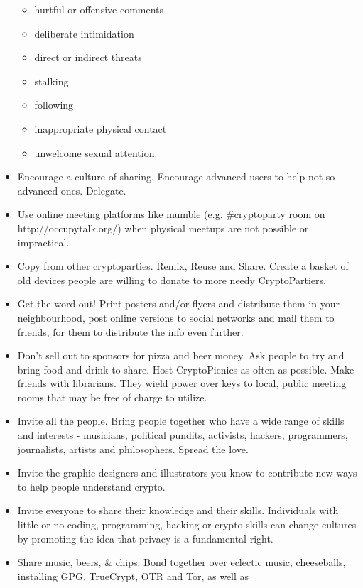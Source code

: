 \begin{itemize}
  \begin{itemize}
  \item
    hurtful or offensive comments
  \item
    deliberate intimidation
  \item
    direct or indirect threats
  \item
    stalking
  \item
    following
  \item
    inappropriate physical contact
  \item
    unwelcome sexual attention.
  \end{itemize}
\item
  Encourage a culture of sharing. Encourage advanced users to help
  not-so advanced ones. Delegate.
\item
  Use online meeting platforms like mumble (e.g. \#cryptoparty room on
  http://occupytalk.org/) when physical meetups are not possible or
  impractical.
\item
  Copy from other cryptoparties. Remix, Reuse and Share. Create a basket
  of old devices people are willing to donate to more needy
  CryptoPartiers.
\item
  Get the word out! Print posters and/or flyers and distribute them in
  your neighbourhood, post online versions to social networks and mail
  them to friends, for them to distribute the info even further.
\item
  Don't sell out to sponsors for pizza and beer money. Ask people to try
  and bring food and drink to share. Host CryptoPicnics as often as
  possible. Make friends with librarians. They wield power over keys to
  local, public meeting rooms that may be free of charge to utilize.
\item
  Invite all the people. Bring people together who have a wide range of
  skills and interests - musicians, political pundits, activists,
  hackers, programmers, journalists, artists and philosophers. Spread
  the love.
\item
  Invite the graphic designers and illustrators you know to contribute
  new ways to help people understand crypto.
\item
  Invite everyone to share their knowledge and their skills. Individuals
  with little or no coding, programming, hacking or crypto skills can
  change cultures by promoting the idea that privacy is a fundamental
  right.
\item
  Share music, beers, \& chips. Bond together over eclectic music,
  cheeseballs, installing GPG, TrueCrypt, OTR and Tor, as well as

\end{itemize}
